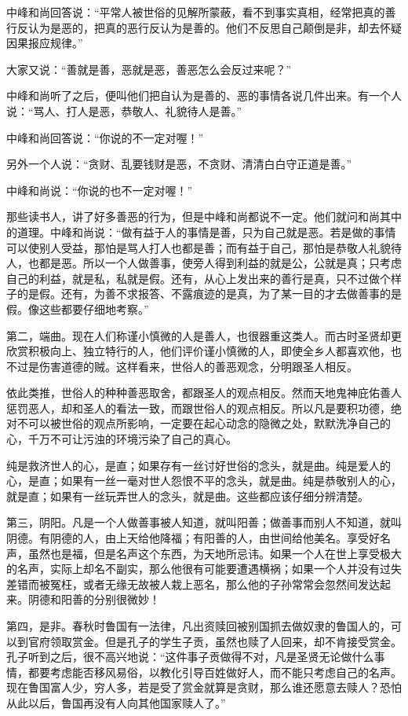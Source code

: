 \documentclass[12pt,UTF8]{ctexbook}
\begin{document}
中峰和尚回答说：“平常人被世俗的见解所蒙蔽，看不到事实真相，经常把真的善行反认为是恶的，把真的恶行反认为是善的。他们不反思自己颠倒是非，却去怀疑因果报应规律。”

大家又说：“善就是善，恶就是恶，善恶怎么会反过来呢？”

中峰和尚听了之后，便叫他们把自认为是善的、恶的事情各说几件出来。有一个人说：“骂人、打人是恶，恭敬人、礼貌待人是善。”

中峰和尚回答说：“你说的不一定对喔！”

另外一个人说：“贪财、乱要钱财是恶，不贪财、清清白白守正道是善。”

中峰和尚说：“你说的也不一定对喔！”

那些读书人，讲了好多善恶的行为，但是中峰和尚都说不一定。他们就问和尚其中的道理。中峰和尚说：“做有益于人的事情是善，只为自己就是恶。若是做的事情可以使别人受益，那怕是骂人打人也都是善；而有益于自己，那怕是恭敬人礼貌待人，也都是恶。所以一个人做善事，使旁人得到利益的就是公，公就是真；只考虑自己的利益，就是私，私就是假。还有，从心上发出来的善行是真，只不过做个样子的是假。还有，为善不求报答、不露痕迹的是真，为了某一目的才去做善事的是假。像这些都要仔细地考察。”

第二，端曲。现在人们称谨小慎微的人是善人，也很器重这类人。而古时圣贤却更欣赏积极向上、独立特行的人，他们评价谨小慎微的人，即使全乡人都喜欢他，也不过是伤害道德的贼。这样看来，世俗人的善恶观念，分明跟圣人相反。

依此类推，世俗人的种种善恶取舍，都跟圣人的观点相反。然而天地鬼神庇佑善人惩罚恶人，却和圣人的看法一致，而跟世俗人的观点相反。所以凡是要积功德，绝对不可以被世俗的观点所影响，一定要在起心动念的隐微之处，默默洗净自己的心，千万不可让污浊的环境污染了自己的真心。

纯是救济世人的心，是直；如果存有一丝讨好世俗的念头，就是曲。纯是爱人的心，是直；如果有一丝一毫对世人怨恨不平的念头，就是曲。纯是恭敬别人的心，就是直；如果有一丝玩弄世人的念头，就是曲。这些都应该仔细分辨清楚。

第三，阴阳。凡是一个人做善事被人知道，就叫阳善；做善事而别人不知道，就叫阴德。有阴德的人，由上天给他降福；有阳善的人，由世间给他美名。享受好名声，虽然也是福，但是名声这个东西，为天地所忌讳。如果一个人在世上享受极大的名声，实际上却名不副实，那么他很有可能要遭遇横祸；如果一个人并没有过失差错而被冤枉，或者无缘无故被人栽上恶名，那么他的子孙常常会忽然间发达起来。阴德和阳善的分别很微妙！

第四，是非。春秋时鲁国有一法律，凡出资赎回被别国抓去做奴隶的鲁国人的，可以到官府领取赏金。但是孔子的学生子贡，虽然也赎了人回来，却不肯接受赏金。孔子听到之后，很不高兴地说：“这件事子贡做得不对，凡是圣贤无论做什么事情，都要考虑能否移风易俗，以教化引导百姓做好人，而不能只考虑自己的名声。现在鲁国富人少，穷人多，若是受了赏金就算是贪财，那么谁还愿意去赎人？恐怕从此以后，鲁国再没有人向其他国家赎人了。”
\end{document}
